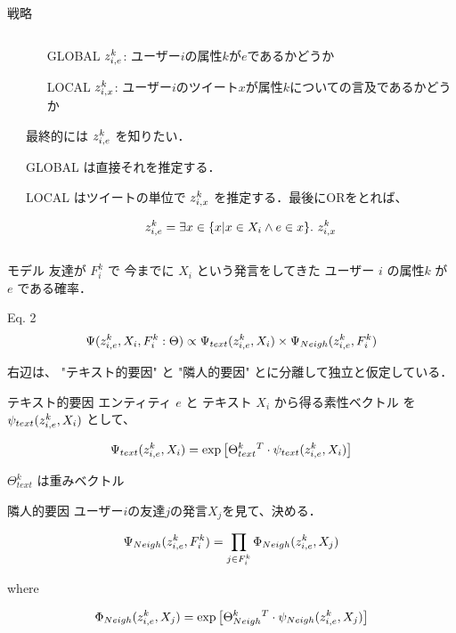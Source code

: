 \documentclass[12pt, dvipdfmx, default, cjk]{beamer}
\begin{document}
\begin{frame}{戦略}
  \begin{columns}
    \begin{column}{0.1\textwidth}
    \end{column}
    \begin{column}{0.9\textwidth}
      \begin{itemize}
        \item[GLOBAL] $z^k_{i,e}$: ユーザー$i$の属性$k$が$e$であるかどうか
        \item[LOCAL] $z^k_{i,x}$: ユーザー$i$のツイート$x$が属性$k$についての言及であるかどうか
      \end{itemize}

      最終的には $z^k_{i,e}$ を知りたい．

      \alert{GLOBAL} は直接それを推定する．

      \alert{LOCAL} はツイートの単位で $z^k_{i,x}$ を推定する．最後にORをとれば、

      \[ z^k_{i,e} = \exists x \in \{ x | x \in X_i \land e \in x \} .~ z^k_{i,x} \]

    \end{column}
  \end{columns}
\end{frame}

\begin{frame}{モデル}
  友達が $F^k_i$ で
  今までに $X_i$ という発言をしてきた
  ユーザー $i$
  の属性$k$ が $e$ である確率．

  \begin{alertblock}{Eq. 2}
  \[
    \Psi(z^k_{i,e}, X_i, F^k_i  :  \Theta)
    \propto
    \Psi_{text}(z^k_{i,e}, X_i) \times
    \Psi_{Neigh}(z^k_{i,e}, F^k_i)
  \]
  \end{alertblock}

  右辺は、
  "テキスト的要因"
  と
  "隣人的要因"
  とに分離して独立と仮定している．

\end{frame}

\begin{frame}{テキスト的要因}
  エンティティ $e$ と テキスト $X_i$ から得る素性ベクトル
  を
  $\psi_{text}(z^k_{i,e}, X_i)$
  として、

  \[
    \Psi_{text}(z^k_{i,e}, X_i) = \exp \left[
      \Theta_{text}^k {}^T \cdot
      \psi_{text}(z^k_{i,e}, X_i)
    \right]
  \]

  $\Theta_{text}^k$ は重みベクトル
\end{frame}

\begin{frame}{隣人的要因}
  ユーザー$i$の友達$j$の発言$X_j$を見て、決める．

  \[
    \Psi_{Neigh}(z^k_{i,e}, F^k_i) = \prod_{j \in F_i^k} \Phi_{Neigh}(z^k_{i,e}, X_j)
  \]

  where

  \[
    \Phi_{Neigh}(z^k_{i,e}, X_j) = \exp \left[
      \Theta_{Neigh}^k {}^T \cdot
      \psi_{Neigh}(z^k_{i,e}, X_j)
    \right]
  \]
\end{frame}
\end{document}
